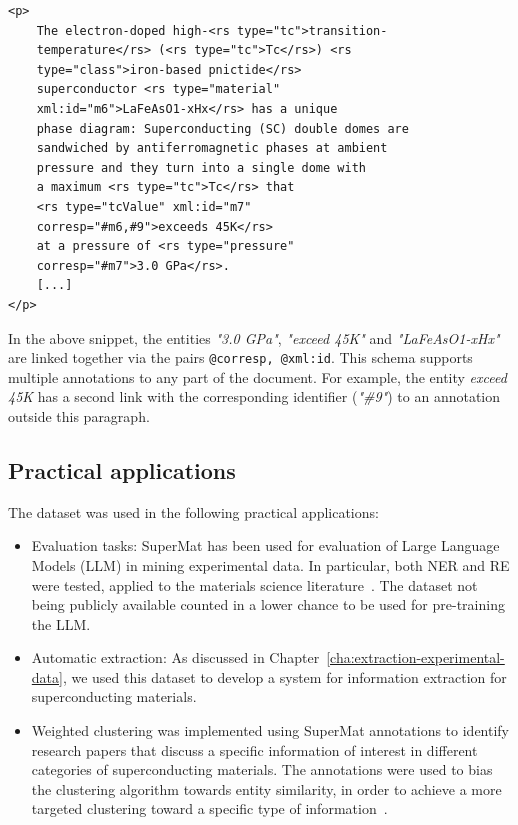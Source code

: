 \begin{verbatim}
<p>
    The electron-doped high-<rs type="tc">transition-
    temperature</rs> (<rs type="tc">Tc</rs>) <rs 
    type="class">iron-based pnictide</rs> 
    superconductor <rs type="material" 
    xml:id="m6">LaFeAsO1-xHx</rs> has a unique 
    phase diagram: Superconducting (SC) double domes are 
    sandwiched by antiferromagnetic phases at ambient 
    pressure and they turn into a single dome with 
    a maximum <rs type="tc">Tc</rs> that 
    <rs type="tcValue" xml:id="m7" 
    corresp="#m6,#9">exceeds 45K</rs> 
    at a pressure of <rs type="pressure" 
    corresp="#m7">3.0 GPa</rs>. 
    [...]
</p>
\end{verbatim}

In the above snippet, the entities \textit{"3.0 GPa"}, \textit{"exceed 45K"} and \textit{"LaFeAsO1-xHx"} are linked together via the pairs \texttt{@corresp, @xml:id}. 
This schema supports multiple annotations to any part of the document. 
For example, the entity \textit{exceed 45K} has a second link with the corresponding identifier (\textit{"\#9"}) to an annotation outside this paragraph.


\subsection{Practical applications}
The dataset was used in the following practical applications: 

\begin{itemize}
    \item Evaluation tasks: SuperMat has been used for evaluation of Large Language Models (LLM) in mining experimental data. In particular, both NER and RE were tested, applied to the materials science literature~\cite{foppiano2024mining}. The dataset not being publicly available counted in a lower chance to be used for pre-training the LLM. 
    \item Automatic extraction: As discussed in Chapter~\ref{cha:extraction-experimental-data}, we used this dataset to develop a system for information extraction for superconducting materials.
    \item Weighted clustering was implemented using SuperMat annotations to identify research papers that discuss a specific information of interest in different categories of superconducting materials. The annotations were used to bias the clustering algorithm towards entity similarity, in order to achieve a more targeted clustering toward a specific type of information~\cite{dieb2022superconductor}.
\end{itemize}

